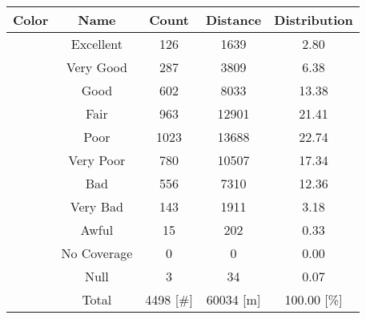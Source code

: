 \begin{tabular}{|c|c|c|c|c|}\hline
\rowcolor{Plum!20}
Color&Name&Count&Distance&Distribution\\\hline\hline
\cellcolor[HTML]{00703c} &Excellent&126&1639&2.80\\\hline
\cellcolor[HTML]{00a032} &Very Good&287&3809&6.38\\\hline
\cellcolor[HTML]{00d228} &Good&602&8033&13.38\\\hline
\cellcolor[HTML]{ffff00} &Fair&963&12901&21.41\\\hline
\cellcolor[HTML]{ffaa00} &Poor&1023&13688&22.74\\\hline
\cellcolor[HTML]{fa6400} &Very Poor&780&10507&17.34\\\hline
\cellcolor[HTML]{ff0000} &Bad&556&7310&12.36\\\hline
\cellcolor[HTML]{dc143c} &Very Bad&143&1911&3.18\\\hline
\cellcolor[HTML]{820000} &Awful&15&202&0.33\\\hline
\cellcolor[HTML]{aaaaaa} &No Coverage&0&0&0.00\\\hline
\cellcolor[HTML]{000000} &Null&3&34&0.07\\\hline
\cellcolor[HTML]{ffffff} &Total&4498 [\#]&60034 [m]&100.00 [\%]\\\hline
\end{tabular}
